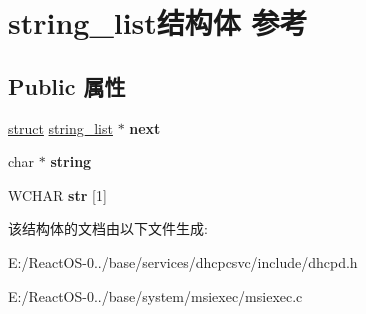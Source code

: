 \hypertarget{structstring__list}{}\section{string\+\_\+list结构体 参考}
\label{structstring__list}
\subsection*{Public 属性}
\begin{DoxyCompactItemize}
\item 
\mbox{\label{structstring__list_a000afc1c8f05fdd80e8eacc7f09abfae}} 
\hyperlink{interfacestruct}{struct} \hyperlink{structstring__list}{string\+\_\+list} $\ast$ {\bfseries next}
\item 
\mbox{\label{structstring__list_ad254142b309cce106c844b80de64cfaa}} 
char $\ast$ {\bfseries string}
\item 
\mbox{\label{structstring__list_a058f975ec2d1804b3626b207d020191c}} 
W\+C\+H\+AR {\bfseries str} \mbox{[}1\mbox{]}
\end{DoxyCompactItemize}


该结构体的文档由以下文件生成\+:\begin{DoxyCompactItemize}
\item 
E\+:/\+React\+O\+S-\/0../base/services/dhcpcsvc/include/dhcpd.\+h\item 
E\+:/\+React\+O\+S-\/0../base/system/msiexec/msiexec.\+c\end{DoxyCompactItemize}
